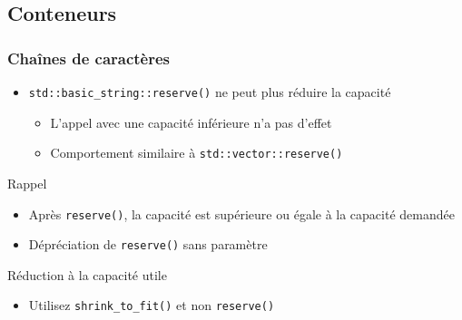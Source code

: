 \documentclass[C++.tex]{subfiles}
\begin{document}
\subsection*{Conteneurs}
\begin{frame}[fragile]
	\frametitle{Chaînes de caractères}
	\begin{itemize}
		\item \lstinline|std::basic_string::reserve()| ne peut plus réduire la capacité
		\begin{itemize}
			\item L'appel avec une capacité inférieure n'a pas d'effet


			\item Comportement similaire à \lstinline|std::vector::reserve()|
		\end{itemize}
	\end{itemize}

	\begin{block}{Rappel}
		\begin{itemize}
			\item Après \lstinline|reserve()|, la capacité est supérieure ou égale à la capacité demandée
		\end{itemize}
	\end{block}

	\begin{itemize}
		\item Dépréciation de \lstinline|reserve()| sans paramètre
	\end{itemize}


	\begin{exampleblock}{Réduction à la capacité utile}
		\begin{itemize}
			\item Utilisez \lstinline|shrink_to_fit()| et non \lstinline|reserve()|
		\end{itemize}

	\end{exampleblock}
\end{frame}
\end{document}
